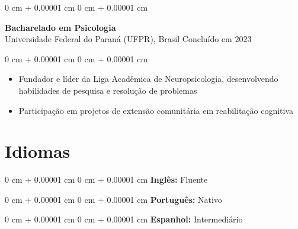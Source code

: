 \documentclass[10pt, letterpaper]{article}
\newenvironment{highlights}{
    \begin{itemize}[
        topsep=0.10 cm,
        parsep=0.10 cm,
        partopsep=0pt,
        itemsep=0pt,
        leftmargin=0 cm + 10pt
    ]
}{
    \end{itemize}
}
\newenvironment{onecolentry}{
    \begin{adjustwidth}{
        0 cm + 0.00001 cm
    }{
        0 cm + 0.00001 cm
    }
}{
    \end{adjustwidth}
}
\begin{document}
\vspace{0.2cm}

\begin{onecolentry}
    \setcolumnwidth{\fill, 4.5cm}
    \begin{paracol}{2}
        \textbf{Bacharelado em Psicologia} \\ Universidade Federal do Paraná (UFPR), Brasil
        \switchcolumn
        \raggedleft Concluído em 2023
    \end{paracol}
\end{onecolentry}
\vspace{0.10cm}
\begin{onecolentry}
    \begin{highlights}
                \item Fundador e líder da Liga Acadêmica de Neuropsicologia, desenvolvendo habilidades de pesquisa e resolução de problemas
                \item Participação em projetos de extensão comunitária em reabilitação cognitiva
    \end{highlights}
\end{onecolentry}

\section{Idiomas}
\begin{onecolentry}{\textbf{Inglês:} Fluente}\end{onecolentry}
\vspace{0.1cm}
\begin{onecolentry}{\textbf{Português:} Nativo}\end{onecolentry}
\vspace{0.1cm}
\begin{onecolentry}{\textbf{Espanhol:} Intermediário}\end{onecolentry}
\end{document}
